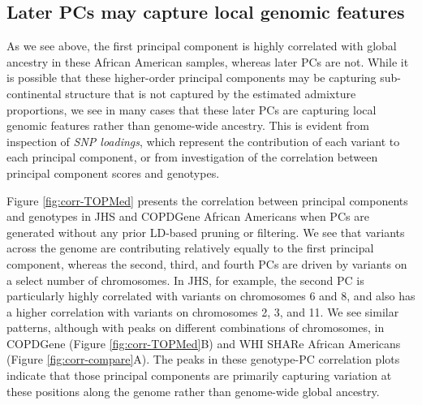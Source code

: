 \documentclass[12pt]{article}
\begin{document}


\subsection{Later PCs may capture local genomic features}
\label{sec:CorrPlots}

%
%


As we see above, the first principal component is highly correlated with global ancestry in these African American samples, whereas later PCs are not.
While it is possible that these higher-order principal components may be capturing sub-continental structure that is not captured by the estimated admixture proportions, we see in many cases that these later PCs are capturing local genomic features rather than genome-wide ancestry. 
This is evident from inspection of \textit{SNP loadings}, which represent the contribution of each variant to each principal component, or from investigation of the correlation between principal component scores and genotypes.

Figure \ref{fig:corr-TOPMed} presents the correlation between principal components and genotypes in JHS and COPDGene African Americans when PCs are generated without any prior LD-based pruning or filtering.
We see that variants across the genome are contributing relatively equally to the first principal component, whereas the second, third, and fourth PCs are driven by variants on a select number of chromosomes.
In JHS, for example, the second PC is particularly highly correlated with variants on chromosomes 6 and 8, and also has a higher correlation with variants on chromosomes 2, 3, and 11.
We see similar patterns, although with peaks on different combinations of chromosomes, in COPDGene (Figure \ref{fig:corr-TOPMed}B) and WHI SHARe African Americans (Figure \ref{fig:corr-compare}A).
The peaks in these genotype-PC correlation plots indicate that those principal components are primarily capturing variation at these positions along the genome rather than genome-wide global ancestry.
\end{document}
